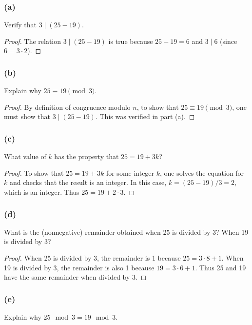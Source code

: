 \documentclass[14pt]{extarticle}
\begin{document}
\subsubsection{(a)}
Verify that \(3 \mid (25 - 19)\).

\begin{proof}
        The relation \(3 \mid (25 - 19)\) is true because \(25 - 19 = 6\) and \(3 \mid 6\) (since \(6 = 3 \cdot 2\)).
\end{proof}

\subsubsection{(b)}
Explain why \(25 \equiv 19 \pmod 3\).

\begin{proof}
        By definition of congruence modulo \(n\), to show that \(25 \equiv 19 \pmod 3\), one must show that \(3 \mid (25-19)\).
        This was verified in part (a).
\end{proof}

\subsubsection{(c)}
What value of \(k\) has the property that \(25 = 19 + 3k\)?

\begin{proof}
        To show that \(25 = 19 + 3k\) for some integer \(k\), one solves the equation for \(k\) and checks that the result is
        an integer. In this case, \(k = (25 - 19)/3 = 2\), which is an integer. Thus \(25 = 19 + 2 \cdot 3\).
\end{proof}

\subsubsection{(d)}
What is the (nonnegative) remainder obtained when 25 is divided by 3? When 19 is divided by 3?

\begin{proof}
        When 25 is divided by 3, the remainder is 1 because \(25 = 3 \cdot 8 + 1\). When 19 is divided by 3, the remainder is
        also 1 because \(19 = 3 \cdot 6 + 1\). Thus 25 and 19 have the same remainder when divided by 3.
\end{proof}

\subsubsection{(e)}
Explain why \(25 \mod 3 = 19 \mod 3\).
\end{document}
